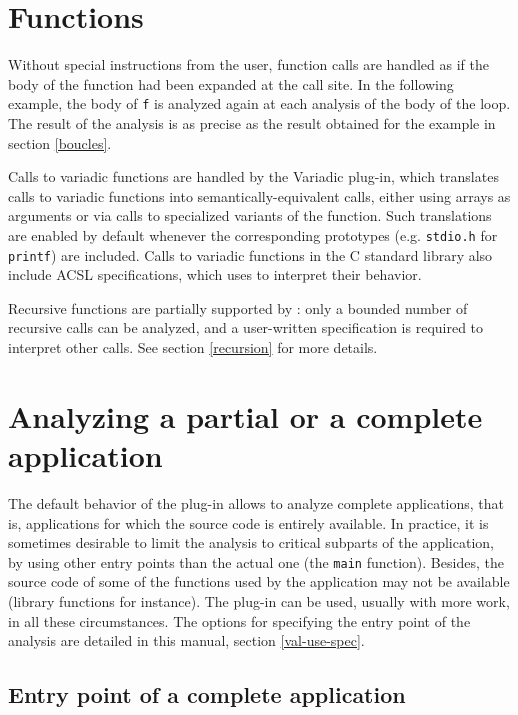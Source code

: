\documentclass{frama-c-book}
\begin{document}
\section{Functions}\label{fonctions}

Without special instructions from the user, function calls are
handled as if the body of the function had been expanded at the
call site. In the following example, the body of \lstinline|f| is analyzed again
at each analysis of the body of the loop. The result of the analysis
is as precise as the result obtained for the example in section \ref{boucles}.


Calls to variadic functions are handled by the \textsf{Variadic} plug-in, which
translates calls to variadic functions into semantically-equivalent calls,
either using arrays as arguments or via calls to specialized variants of the
function. Such translations are enabled by default whenever the corresponding
prototypes (e.g. \lstinline|stdio.h| for \lstinline|printf|) are included.
Calls to variadic functions in the C standard library also include
ACSL specifications, which \Eva{} uses to interpret their behavior.

Recursive functions are partially supported by \Eva{}: only a bounded
number of recursive calls can be analyzed, and a user-written specification
is required to interpret other calls.
See section \ref{recursion} for more details.

\section{Analyzing a partial or a complete application}

The default behavior of the \Eva{} plug-in allows to
analyze complete applications,
that is, applications for which the source code is entirely
available. In practice, it is sometimes desirable to limit the analysis
to critical subparts of the application, by using other entry points
than the actual one (the \lstinline|main| function).
Besides, the source code of some of the functions used by
the application may not be available (library functions for instance).
The plug-in can be used, usually with more work, in all these circumstances.
The options for specifying the entry point of the analysis are detailed
in this manual, section \ref{val-use-spec}.

\subsection{Entry point of a complete application}
\end{document}
